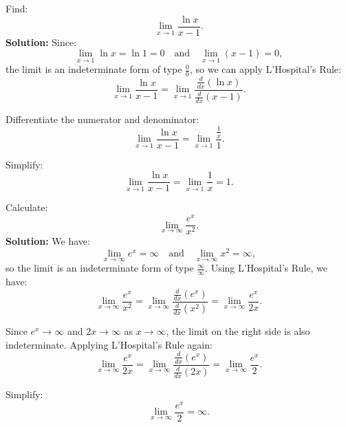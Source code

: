\documentclass[12pt]{article}
\theoremstyle{beautifulthm}
\begin{document}
\begin{tcolorbox}[colback=examplebg, colframe=red!75!black, title=\textbf{EXAMPLE 1: Using L'hospital to find the Limit}, fonttitle=\bfseries, sharp corners]
Find:
\[
\lim_{x \to 1} \frac{\ln x}{x - 1}.
\]
\tcblower
\textbf{Solution:} 
Since:
\[
\lim_{x \to 1} \ln x = \ln 1 = 0 \quad \text{and} \quad \lim_{x \to 1} (x - 1) = 0,
\]
the limit is an indeterminate form of type \( \frac{0}{0} \), so we can apply L'Hospital's Rule:
\[
\lim_{x \to 1} \frac{\ln x}{x - 1} = \lim_{x \to 1} \frac{\frac{d}{dx}(\ln x)}{\frac{d}{dx}(x - 1)}.
\]

Differentiate the numerator and denominator:
\[
\lim_{x \to 1} \frac{\ln x}{x - 1} = \lim_{x \to 1} \frac{\frac{1}{x}}{1}.
\]

Simplify:
\[
\lim_{x \to 1} \frac{\ln x}{x - 1} = \lim_{x \to 1} \frac{1}{x} = 1.
\]
\end{tcolorbox}



\begin{tcolorbox}[colback=examplebg, colframe=red!75!black, title=\textbf{EXAMPLE 2: Using L'hospital to find the Limit}, fonttitle=\bfseries, sharp corners]
Calculate:
\[
\lim_{x \to \infty} \frac{e^x}{x^2}.
\]
\tcblower
\textbf{Solution:} 
We have:
\[
\lim_{x \to \infty} e^x = \infty \quad \text{and} \quad \lim_{x \to \infty} x^2 = \infty,
\]
so the limit is an indeterminate form of type \( \frac{\infty}{\infty} \). Using L'Hospital's Rule, we have:
\[
\lim_{x \to \infty} \frac{e^x}{x^2} = \lim_{x \to \infty} \frac{\frac{d}{dx}(e^x)}{\frac{d}{dx}(x^2)} = \lim_{x \to \infty} \frac{e^x}{2x}.
\]

Since \( e^x \to \infty \) and \( 2x \to \infty \) as \( x \to \infty \), the limit on the right side is also indeterminate. Applying L'Hospital's Rule again:
\[
\lim_{x \to \infty} \frac{e^x}{2x} = \lim_{x \to \infty} \frac{\frac{d}{dx}(e^x)}{\frac{d}{dx}(2x)} = \lim_{x \to \infty} \frac{e^x}{2}.
\]

Simplify:
\[
\lim_{x \to \infty} \frac{e^x}{2} = \infty.
\]
\end{tcolorbox}
\end{document}
